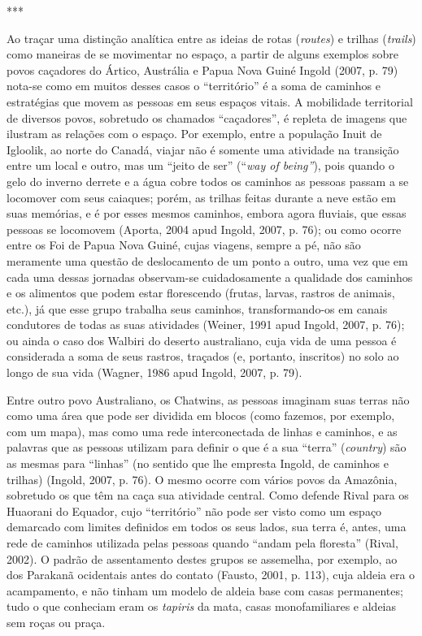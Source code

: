 ***

Ao traçar uma distinção analítica entre as ideias de rotas
(\emph{routes}) e trilhas (\emph{trails}) como maneiras de se movimentar
no espaço, a partir de alguns exemplos sobre povos caçadores do Ártico,
Austrália e Papua Nova Guiné Ingold (2007, p. 79) nota-se como em muitos
desses casos o ``território'' é a soma de caminhos e estratégias que
movem as pessoas em seus espaços vitais. A mobilidade territorial de
diversos povos, sobretudo os chamados ``caçadores'', é repleta de
imagens que ilustram as relações com o espaço. Por exemplo, entre a
população Inuit de Igloolik, ao norte do Canadá, viajar não é somente
uma atividade na transição entre um local e outro, mas um ``jeito de
ser'' (``\emph{way of being''}), pois quando o gelo do inverno derrete e
a água cobre todos os caminhos as pessoas passam a se locomover com seus
caiaques; porém, as trilhas feitas durante a neve estão em suas
memórias, e é por esses mesmos caminhos, embora agora fluviais, que
essas pessoas se locomovem (Aporta, 2004 apud Ingold, 2007, p. 76); ou
como ocorre entre os Foi de Papua Nova Guiné, cujas viagens, sempre a
pé, não são meramente uma questão de deslocamento de um ponto a outro,
uma vez que em cada uma dessas jornadas observam-se cuidadosamente a
qualidade dos caminhos e os alimentos que podem estar florescendo
(frutas, larvas, rastros de animais, etc.), já que esse grupo trabalha
seus caminhos, transformando-os em canais condutores de todas as suas
atividades (Weiner, 1991 apud Ingold, 2007, p. 76); ou ainda o caso dos
Walbiri do deserto australiano, cuja vida de uma pessoa é considerada a
soma de seus rastros, traçados (e, portanto, inscritos) no solo ao longo
de sua vida (Wagner, 1986 apud Ingold, 2007, p. 79).

Entre outro povo Australiano, os Chatwins, as pessoas imaginam suas
terras não como uma área que pode ser dividida em blocos (como fazemos,
por exemplo, com um mapa), mas como uma rede interconectada de linhas e
caminhos, e as palavras que as pessoas utilizam para definir o que é a
sua ``terra'' (\emph{country}) são as mesmas para ``linhas'' (no sentido
que lhe empresta Ingold, de caminhos e trilhas) (Ingold, 2007, p. 76). O
mesmo ocorre com vários povos da Amazônia, sobretudo os que têm na caça
sua atividade central. Como defende Rival para os Huaorani do Equador,
cujo ``território'' não pode ser visto como um espaço demarcado com
limites definidos em todos os seus lados, sua terra é, antes, uma rede
de caminhos utilizada pelas pessoas quando ``andam pela floresta''
(Rival, 2002). O padrão de assentamento destes grupos se assemelha, por
exemplo, ao dos Parakanã ocidentais antes do contato (Fausto, 2001, p.
113), cuja aldeia era o acampamento, e não tinham um modelo de aldeia
base com casas permanentes; tudo o que conheciam eram os \emph{tapiris}
da mata, casas monofamiliares e aldeias sem roças ou praça.

